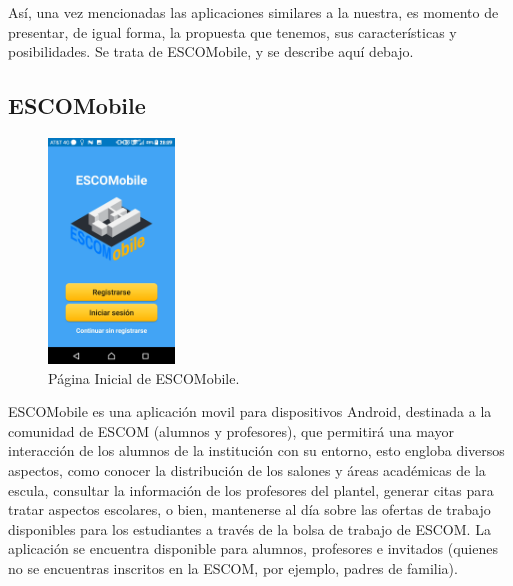\noindent
\newline
\newline
Así, una vez mencionadas las aplicaciones similares a la nuestra, es momento de presentar, de igual forma, la propuesta que tenemos, sus características y posibilidades. Se trata de ESCOMobile, y se describe aquí debajo.

\pagebreak
\subsection{ESCOMobile}

	\begin{figure}[htbp!]
		\centering
		\includegraphics[width=0.3\textwidth]{estado_arte/fotosarte/ESCOMobile}
		\caption{Página Inicial de ESCOMobile.}
	\end{figure}

	\noindent
	ESCOMobile es una aplicación movil para dispositivos Android, destinada a la comunidad de ESCOM (alumnos y profesores), que permitirá una mayor interacción de los alumnos de la institución con su entorno, esto engloba diversos aspectos, como conocer la distribución de los salones y áreas académicas de la escula, consultar la información de los profesores del plantel, generar citas para tratar aspectos escolares, o bien, mantenerse al día sobre las ofertas de trabajo disponibles para los estudiantes a través de la bolsa de trabajo de ESCOM. La aplicación se encuentra disponible para alumnos, profesores e invitados (quienes no se encuentras inscritos en la ESCOM, por ejemplo, padres de familia). 
	
